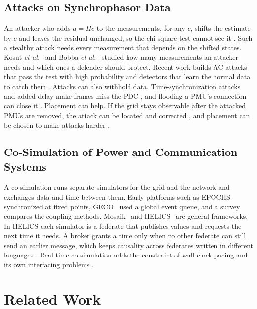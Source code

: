 \documentclass[journal]{IEEEtran}
\begin{document}
\subsection{Attacks on Synchrophasor Data}

An attacker who adds $a = Hc$ to the measurements, for any $c$, shifts the estimate by $c$ and leaves the residual unchanged, so the chi-square test cannot see it \cite{liu2009fdi}. Such a stealthy attack needs every measurement that depends on the shifted states. Kosut \emph{et al.}~\cite{kosut2011} and Bobba \emph{et al.}~\cite{bobba2010} studied how many measurements an attacker needs and which ones a defender should protect. Recent work builds AC attacks that pass the test with high probability \cite{yang2024tensor} and detectors that learn the normal data to catch them \cite{chen2022datadriven,bhattacharjee2023deep}. Attacks can also withhold data. Time-synchronization attacks and added delay make frames miss the PDC \cite{zadsar2023preventing,zadsar2024integrated,shereen2024topology}, and flooding a PMU's connection can close it \cite{swain2024network}. Placement can help. If the grid stays observable after the attacked PMUs are removed, the attack can be located and corrected \cite{khalafi2022intrusion}, and placement can be chosen to make attacks harder \cite{pourahmad2023pmupdc}.

\subsection{Co-Simulation of Power and Communication Systems}

A co-simulation runs separate simulators for the grid and the network and exchanges data and time between them. Early platforms such as EPOCHS~\cite{hopkinson2006} synchronized at fixed points, GECO~\cite{lin2012geco} used a global event queue, and a survey~\cite{mets2014} compares the coupling methods. Mosaik~\cite{schutte2011mosaik} and HELICS~\cite{palmintier2017helics,hardy2024helics} are general frameworks. In HELICS each simulator is a federate that publishes values and requests the next time it needs. A broker grants a time only when no other federate can still send an earlier message, which keeps causality across federates written in different languages \cite{hardy2024helics}. Real-time co-simulation adds the constraint of wall-clock pacing and its own interfacing problems \cite{qiu2025cyber,dabashi2026innovative}.

\section{Related Work}
\label{sec:related}
\end{document}

